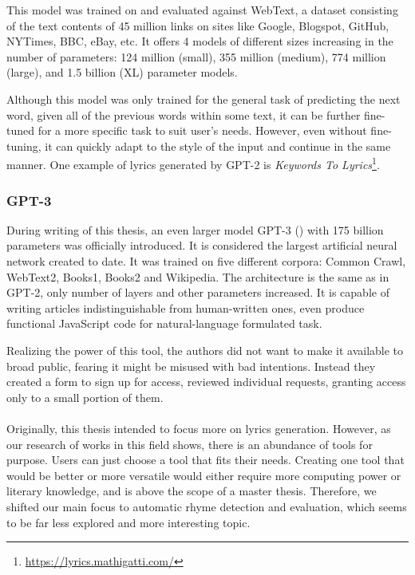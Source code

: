 This model was trained on and evaluated against WebText, a dataset consisting of the text contents of 45 million links on sites like Google, Blogspot, GitHub, NYTimes, BBC, eBay, etc. It offers 4 models of different sizes increasing in the number of parameters: 124 million (small), 355 million (medium), 774 million (large), and 1.5 billion (XL) parameter models.

Although this model was only trained for the general task of predicting the next word, given all of the previous words within some text, it can be further fine-tuned for a more specific task to suit user's needs. However, even without fine-tuning, it can quickly adapt to the style of the input and continue in the same manner. One example of lyrics generated by GPT-2 is \textit{Keywords To Lyrics}\footnote{\url{https://lyrics.mathigatti.com/}}.

\subsubsection*{GPT-3}
During writing of this thesis, an even larger model GPT-3 (\cite{brown2020gpt3}) with 175 billion parameters was officially introduced. It is considered the largest artificial neural network created to date.
It was trained on five different corpora: Common Crawl, WebText2, Books1, Books2 and Wikipedia. The architecture is the same as in GPT-2, only number of layers and other parameters increased. It is capable of writing articles indistinguishable from human-written ones,
even produce functional JavaScript code for natural-language formulated task.

Realizing the power of this tool, the authors did not want to make it available to broad public, fearing it might be misused with bad intentions. Instead they created a form to sign up for access, reviewed individual requests, granting access only to a small portion of them.



\paragraph{}Originally, this thesis intended to focus more on lyrics generation. However, as our research of works in this field shows, there is an abundance of tools for  purpose. Users can just choose a tool that fits their needs. Creating one tool that would be better or more versatile would either require more computing power or literary knowledge, and is above the scope of a master thesis. Therefore, we shifted our main focus to automatic rhyme detection and evaluation, which seems to be far less explored and more interesting topic.



